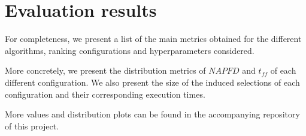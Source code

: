 \appendix




\chapter{Evaluation results}
\label{sec:appendix-evaluation-results}
For completeness, we present a list of the main metrics obtained
for the different algorithms, ranking configurations and hyperparameters considered.

More concretely, we present the distribution metrics of $NAPFD$ and $t_{ff}$
of each different configuration. We also present the size of the induced selections
of each configuration and their corresponding execution times.

More values and distribution plots can be found in the accompanying repository
of this project.

\begin{tiny}



\end{tiny}
